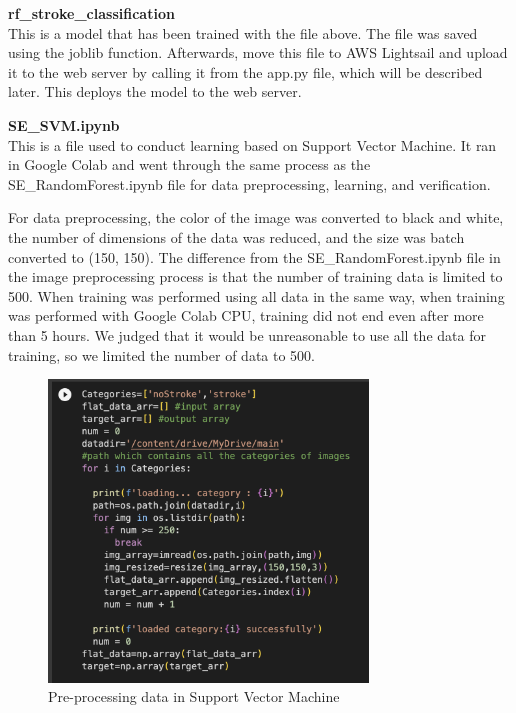 \textbf{rf\_stroke\_classification} \\
This is a model that has been trained with the file above. The file was saved using the joblib function. Afterwards, move this file to AWS Lightsail and upload it to the web server by calling it from the app.py file, which will be described later. This deploys the model to the web server.

\textbf{SE\_SVM.ipynb} \\
This is a file used to conduct learning based on Support Vector Machine. It ran in Google Colab and went through the same process as the SE\_RandomForest.ipynb file for data preprocessing, learning, and verification.

For data preprocessing, the color of the image was converted to black and white, the number of dimensions of the data was reduced, and the size was batch converted to (150, 150). The difference from the SE\_RandomForest.ipynb file in the image preprocessing process is that the number of training data is limited to 500. When training was performed using all data in the same way, when training was performed with Google Colab CPU, training did not end even after more than 5 hours. We judged that it would be unreasonable to use all the data for training, so we limited the number of data to 500.

\begin{figure}[h]
    \centering
    \includegraphics[width=8.5cm]{images/svm_data.png}
    \caption{Pre-processing data in Support Vector Machine}
    \label{fig:enter-label}
\end{figure}

